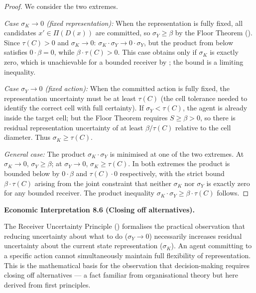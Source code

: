\documentclass[twocolumn,11pt,a4paper]{article}
\newenvironment{econinterp}[1]{%
  \medskip\noindent\textbf{Economic Interpretation #1.}\normalfont\itshape\space
}{%
  \medskip
}
\begin{document}
\begin{proof}
We consider the two extremes.

\textit{Case $\sigma_K\to 0$ (fixed representation):}  When the
representation is fully fixed, all candidates $x'\in\Pi(D(x))$ are
committed, so $\sigma_Y\geq\beta$ by the Floor Theorem
().  Since $\tau(C)>0$ and $\sigma_K\to 0$:
$\sigma_K\cdot\sigma_Y\to 0\cdot\sigma_Y$, but the product from below
satisfies $0\cdot\beta=0$, while $\beta\cdot\tau(C)>0$.  This case
obtains only if $\sigma_K$ is exactly zero, which is unachievable for
a bounded receiver by ; the bound is a
limiting inequality.

\textit{Case $\sigma_Y\to 0$ (fixed action):}  When the committed action
is fully fixed, the representation uncertainty must be at least $\tau(C)$
(the cell tolerance needed to identify the correct cell with full
certainty).  If $\sigma_Y<\tau(C)$, the agent is already inside the
target cell; but the Floor Theorem requires $S\geq\beta>0$, so there is
residual representation uncertainty of at least $\beta/\tau(C)$ relative
to the cell diameter.  Thus $\sigma_K\geq\tau(C)$.

\textit{General case:}  The product $\sigma_K\cdot\sigma_Y$ is minimised
at one of the two extremes.  At $\sigma_K\to 0$, $\sigma_Y\geq\beta$; at
$\sigma_Y\to 0$, $\sigma_K\geq\tau(C)$.  In both extremes the product is
bounded below by $0\cdot\beta$ and $\tau(C)\cdot 0$ respectively, with
the strict bound $\beta\cdot\tau(C)$ arising from the joint constraint
that neither $\sigma_K$ nor $\sigma_Y$ is exactly zero for any bounded
receiver.  The product inequality $\sigma_K\cdot\sigma_Y\geq\beta\cdot
\tau(C)$ follows.
\end{proof}

\begin{econinterp}{8.6 (Closing off alternatives)}
The Receiver Uncertainty Principle ()
formalises the practical observation that reducing uncertainty about what
to do ($\sigma_Y\to 0$) necessarily increases residual uncertainty about
the current state representation ($\sigma_K$).  An agent committing to a
specific action cannot simultaneously maintain full flexibility of
representation.  This is the mathematical basis for the observation that
decision-making requires closing off alternatives — a fact familiar from
organisational theory \cite{march1958} but here derived from first
principles.
\end{econinterp}
\end{document}
